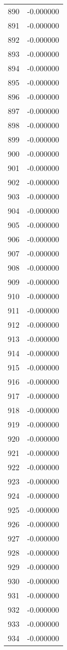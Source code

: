 \documentclass[12pt]{article}
\begin{document}
\begin{longtable}{@{}cc@{}}
890 & -0.000000 \\
891 & -0.000000 \\
892 & -0.000000 \\
893 & -0.000000 \\
894 & -0.000000 \\
895 & -0.000000 \\
896 & -0.000000 \\
897 & -0.000000 \\
898 & -0.000000 \\
899 & -0.000000 \\
900 & -0.000000 \\
901 & -0.000000 \\
902 & -0.000000 \\
903 & -0.000000 \\
904 & -0.000000 \\
905 & -0.000000 \\
906 & -0.000000 \\
907 & -0.000000 \\
908 & -0.000000 \\
909 & -0.000000 \\
910 & -0.000000 \\
911 & -0.000000 \\
912 & -0.000000 \\
913 & -0.000000 \\
914 & -0.000000 \\
915 & -0.000000 \\
916 & -0.000000 \\
917 & -0.000000 \\
918 & -0.000000 \\
919 & -0.000000 \\
920 & -0.000000 \\
921 & -0.000000 \\
922 & -0.000000 \\
923 & -0.000000 \\
924 & -0.000000 \\
925 & -0.000000 \\
926 & -0.000000 \\
927 & -0.000000 \\
928 & -0.000000 \\
929 & -0.000000 \\
930 & -0.000000 \\
931 & -0.000000 \\
932 & -0.000000 \\
933 & -0.000000 \\
934 & -0.000000 \\

\end{longtable}
\end{document}
